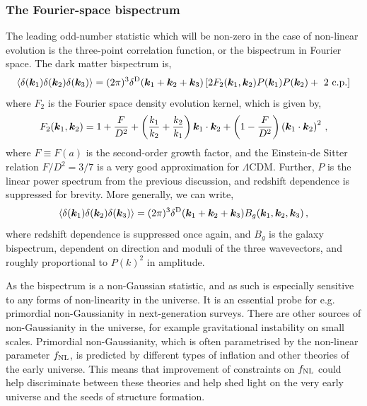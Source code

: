 \subsubsection{The Fourier-space bispectrum}

The leading odd-number statistic which will be non-zero in the case of non-linear evolution is the three-point correlation function, or the bispectrum in Fourier space. The dark matter bispectrum is, 
\begin{equation}
	\langle \delta(\bm {k}_1) \delta(\bm {k}_2) \delta(\bm {k}_3) \rangle = (2 \pi )^3 \delta^\mathrm{D}(\bm {k}_1 + \bm {k}_2 + \bm {k}_3) \left[ 2 F_2(\bm {k}_1,\bm {k}_2) P(\bm {k}_1) P(\bm {k}_2) + \text{ 2 c.p.} \right]
\end{equation}
where $F_2$ is the Fourier space density evolution kernel, which is given by, 
\begin{equation}
	F_2(\bm {k}_1,\bm {k}_2) = 1 + \frac{F}{D^2} + \left( \frac{k_1}{k_2} + \frac{k_2}{k_1} \right) \bm {k}_1 \cdot \bm {k}_2 + \left( 1 - \frac{F}{D^2} \right) \left( \bm {k}_1 \cdot \bm {k}_2 \right)^2\,,	
\end{equation}
where $F \equiv F(a)$ is the second-order growth factor, and the Einstein-de Sitter relation $F/D^2 = 3/7$ is a very good approximation for $\Lambda$CDM. Further, $P$ is the linear power spectrum from the previous discussion, and redshift dependence is suppressed for brevity. More generally, we can write, 
\begin{equation}
	\langle \delta(\bm {k}_1) \delta(\bm {k}_2) \delta(\bm {k}_3) \rangle = (2 \pi )^3 \delta^\mathrm{D}(\bm {k}_1 + \bm {k}_2 + \bm {k}_3) B_g(\bm {k}_1,\bm {k}_2,\bm {k}_3)\,,
\end{equation}
where redshift dependence is suppressed once again, and $B_g$ is the galaxy bispectrum, dependent on direction and moduli of the three wavevectors, and roughly proportional to $P(k)^2$ in amplitude.

As the bispectrum is a non-Gaussian statistic, and as such is especially sensitive to any forms of non-linearity in the universe. It is an essential probe for e.g. primordial non-Gaussianity in next-generation surveys. There are other sources of non-Gaussianity in the universe, for example gravitational instability on small scales. Primordial non-Gaussianity, which is often parametrised by the non-linear parameter $f_\text{NL}$, is predicted by different types of inflation and other theories of the early universe. This means that improvement of constraints on $f_\text{NL}$ could help discriminate between these theories and help shed light on the very early universe and the seeds of structure formation. 

